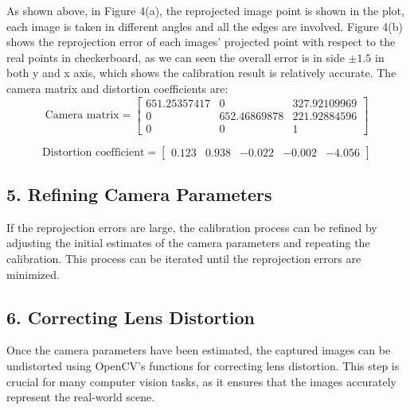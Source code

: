 \documentclass{article}
\begin{document}
\noindent
As shown above, in Figure 4(a), the reprojected image point is shown in the plot,
each image is taken in different angles and all the edges are involved. 
\newline
Figure 4(b)
shows the reprojection error of each images' projected point with respect to the 
real points in checkerboard, as we can seen the overall error is in side $\pm 1.5$ in both
y and x axis, which shows the calibration result is relatively accurate.
\newline
The camera matrix and distortion coefficients are:
\begin{equation*}
    \text{Camera matrix} = 
    \begin{bmatrix}
        651.25357417 &   0&         327.92109969\\
        0&         652.46869878& 221.92884596\\
        0&           0&           1        
    \end{bmatrix}
\end{equation*}

\begin{equation*}
    \text{Distortion coefficient} = 
    \begin{bmatrix}
        0.123 & 0.938 & -0.022 & -0.002 & -4.056
    \end{bmatrix}
\end{equation*}



\subsection*{5. Refining Camera Parameters}
If the reprojection errors are large, 
the calibration process can be refined by adjusting 
the initial estimates of the camera parameters and repeating the calibration. 
This process can be iterated until the reprojection errors are minimized.

\subsection*{6. Correcting Lens Distortion}
Once the camera parameters have been estimated, 
the captured images can be undistorted using OpenCV's 
functions for correcting lens distortion. 
This step is crucial for many computer vision tasks, 
as it ensures that the images accurately represent the real-world scene.
\end{document}
